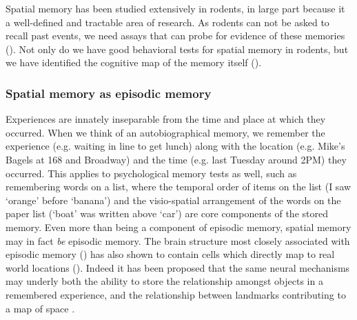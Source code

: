 Spatial memory has been studied extensively in rodents, in large part because it a well-defined and tractable area of research.
As rodents can not be asked to recall past events, we need assays that can probe for evidence of these memories ().
Not only do we have good behavioral tests for spatial memory in rodents, but we have identified the cognitive map of the memory itself ().

\subsubsection{Spatial memory as episodic memory}\label{sec:intro:memory:spatial-episodic}


Experiences are innately inseparable from the time and place at which they occurred.
When we think of an autobiographical memory, we remember the experience (e.g. waiting in line to get lunch) along with the location (e.g. Mike's Bagels at 168 and Broadway) and the time (e.g. last Tuesday around 2PM) they occurred.
This applies to psychological memory tests as well, such as remembering words on a list, where the temporal order of items on the list (I saw `orange' before `banana') and the visio-spatial arrangement of the words on the paper list (`boat' was written above `car') are core components of the stored memory.
Even more than being a component of episodic memory, spatial memory may in fact \emph{be} episodic memory.
The brain structure most closely associated with episodic memory () has also shown to contain cells which directly map to real world locations ().
Indeed it has been proposed that the same neural mechanisms may underly both the ability to store the relationship amongst objects in a remembered experience, and the relationship between landmarks contributing to a map of space \citep{Buzsaki2013}.

